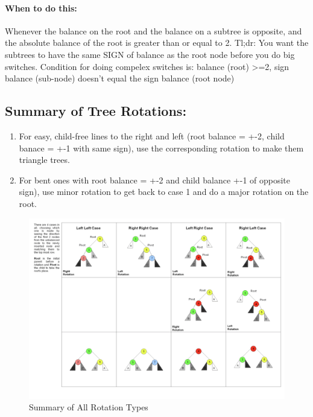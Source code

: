 \documentclass[a4paper,12pt]{report}
\begin{document}
\paragraph{When to do this: } Whenever the balance on the root and the balance on a subtree is opposite, and the absolute balance of the root is greater than or equal to 2. Tl;dr: You want the subtrees to have the same SIGN of balance as the root node before you do big switches. Condition for doing compelex switches is: balance (root) >=2, sign balance (sub-node) doesn't equal the sign balance (root node)

\subsection{Summary of Tree Rotations: }
\begin{enumerate}
\item For easy, child-free lines to the right and left (root balance = +-2, child banace = +-1 with same sign), use the corresponding rotation to make them triangle trees.
\item For bent ones with root balance = +-2 and child balance +-1 of opposite sign), use minor rotation to get back to case 1 and do a major rotation on the root. 
\end{enumerate}

\begin{figure}[h]
\centering
\includegraphics[width=1\textwidth]{media/tree-rotation-summary.png}
\caption{Summary of All Rotation Types}
\label{Tree Rotation Summary}
\end{figure}
\end{document}
